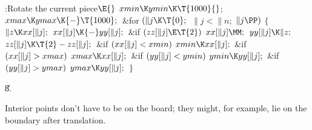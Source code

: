 \B{}:Rotate the current piece\X${}\E{}$\6
$\\{xmin}\K\\{ymin}\K\T{1000}{}$;\5
${}\\{xmax}\K\\{ymax}\K{-}\T{1000};{}$\6
\&{for} ${}(\|j\K\T{0};{}$ ${}\|j<\|n;{}$ ${}\|j\PP){}$\5
${}\{{}$\1\6
${}\|z\K\\{xx}[\|j];{}$\6
${}\\{xx}[\|j]\K{-}\\{yy}[\|j];{}$\6
\&{if} ${}(\\{zz}[\|j]\E\T{2}){}$\1\5
${}\\{xx}[\|j]\MM;{}$\2\6
${}\\{yy}[\|j]\K\|z;{}$\6
${}\\{zz}[\|j]\K\T{2}-\\{zz}[\|j];{}$\6
\&{if} ${}(\\{xx}[\|j]<\\{xmin}){}$\1\5
${}\\{xmin}\K\\{xx}[\|j];{}$\2\6
\&{if} ${}(\\{xx}[\|j]>\\{xmax}){}$\1\5
${}\\{xmax}\K\\{xx}[\|j];{}$\2\6
\&{if} ${}(\\{yy}[\|j]<\\{ymin}){}$\1\5
${}\\{ymin}\K\\{yy}[\|j];{}$\2\6
\&{if} ${}(\\{yy}[\|j]>\\{ymax}){}$\1\5
${}\\{ymax}\K\\{yy}[\|j];{}$\2\6
\4${}\}{}$\2\par
\U8.\fi

Interior points don't have to be on the board; they
might, for example,
lie on the boundary after translation.

